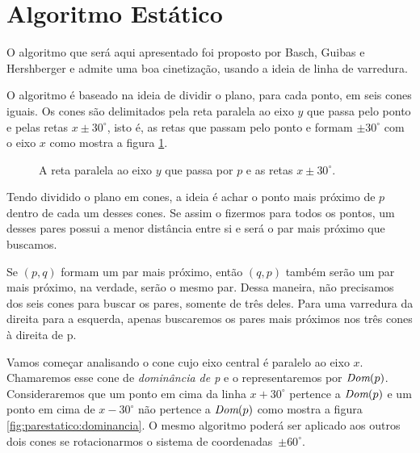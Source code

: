 
\FloatBarrier
\section{Algoritmo Estático}

O algoritmo que será aqui apresentado foi proposto por Basch, Guibas
e Hershberger e admite uma boa cinetização, usando a ideia de linha
de varredura.

O algoritmo é baseado na ideia de dividir o plano, para cada ponto,
em seis cones iguais. Os cones são delimitados pela reta paralela ao
eixo $y$ que passa pelo ponto e pelas retas $x \pm 30^\circ$, isto
é, as retas que passam pelo ponto e formam $\pm 30^\circ$ com o eixo
$x$ como mostra a figura \ref{fig:parestatico:cones}.

\begin{figure}
    \centering
    \caption{A reta paralela ao eixo $y$ que passa por
    $p$ e as retas $x \pm 30^\circ$.}
    \label{fig:parestatico:cones}
\end{figure}

Tendo dividido o plano em cones, a ideia é achar o ponto mais próximo de $p$
dentro de cada um desses cones. Se assim o fizermos para todos os pontos, um
desses pares possui a menor distância entre si e será o par mais próximo que
buscamos.

Se $(p, q)$ formam um par mais próximo, então $(q, p)$ também serão um par
mais próximo, na verdade, serão o mesmo par. Dessa maneira, não precisamos
dos seis cones para buscar os pares, somente de três deles. Para uma
varredura da direita para a esquerda, apenas buscaremos os pares mais
próximos nos três cones à direita de p.

Vamos começar analisando o cone cujo eixo central é paralelo ao eixo $x$.
Chamaremos esse cone de \textit{dominância de p} e o representaremos por
$\textit{Dom}(p)$. Consideraremos que um ponto em cima da linha $x + 30^\circ$
pertence a $\textit{Dom}(p)$ e um ponto em cima de $x - 30^\circ$ não pertence a
$\textit{Dom}(p)$ como mostra a figura \ref{fig:parestatico:dominancia}. O mesmo
algoritmo poderá ser aplicado aos outros dois cones se rotacionarmos o
sistema de coordenadas~$\pm 60^\circ$.

